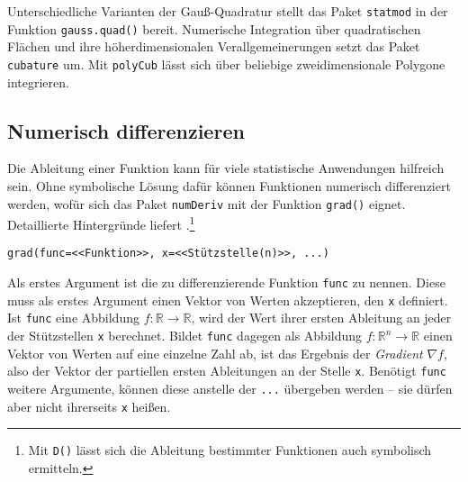 Unterschiedliche Varianten der Gauß-Quadratur stellt das Paket \lstinline!statmod! \cite{Smyth2015} in der Funktion \lstinline!gauss.quad()! bereit. Numerische Integration über quadratischen Flächen und ihre höherdimensionalen Verallgemeinerungen setzt das Paket \lstinline!cubature! \cite{Balasubramanian2013} um. Mit \lstinline!polyCub! \cite{Meyer2014} lässt sich über beliebige zweidimensionale Polygone integrieren.

\subsection{Numerisch differenzieren}
\label{sec:numDeriv}

Die Ableitung einer Funktion kann für viele statistische Anwendungen hilfreich sein. Ohne symbolische Lösung dafür können Funktionen numerisch differenziert werden, wofür sich das Paket \lstinline!numDeriv! \cite{Gilbert2015} mit der Funktion \lstinline!grad()! eignet. Detaillierte Hintergründe liefert .\footnote{Mit \lstinline!D()! lässt sich die Ableitung bestimmter Funktionen auch symbolisch ermitteln.}
\begin{lstlisting}
grad(func=<<Funktion>>, x=<<Stützstelle(n)>>, ...)
\end{lstlisting}

Als erstes Argument ist die zu differenzierende Funktion \lstinline!func! zu nennen. Diese muss als erstes Argument einen Vektor von Werten akzeptieren, den \lstinline!x! definiert. Ist \lstinline!func! eine Abbildung $f: \mathbb{R} \rightarrow \mathbb{R}$, wird der Wert ihrer ersten Ableitung an jeder der Stützstellen \lstinline!x! berechnet. Bildet \lstinline!func! dagegen als Abbildung $f: \mathbb{R}^{n} \rightarrow \mathbb{R}$ einen Vektor von Werten auf eine einzelne Zahl ab, ist das Ergebnis der \emph{Gradient} $\nabla f$, also der Vektor der partiellen ersten Ableitungen an der Stelle \lstinline!x!. Benötigt \lstinline!func! weitere Argumente, können diese anstelle der \lstinline!...! übergeben werden -- sie dürfen aber nicht ihrerseits \lstinline!x! heißen.


